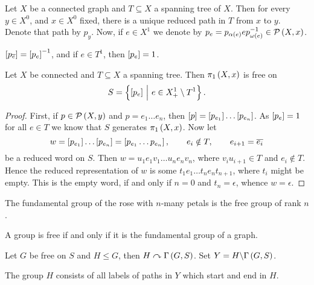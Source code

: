 \begin{definition}
Let $ X $ be a connected graph and $ T \subseteq X $ a spanning tree of $ X $. Then for every $ y \in X^0 $, and $ x \in X^0 $ fixed, there is a unique reduced path in $ T $ from $ x $ to $ y $. Denote that path by $ p_y $. Now, if $ e \in X^1 $ we denote by $ p_e = p_{\alpha\br{e}}ep_{\omega\br{e}}^{-1} \in \PPP\br{X, x} $.
\end{definition}

\begin{note*}
$ \sbr{p_{\overline{e}}} = \sbr{p_e}^{-1} $, and if $ e \in T^1 $, then $ \sbr{p_e} = 1 $.
\end{note*}

\begin{theorem}
Let $ X $ be connected and $ T \subseteq X $ a spanning tree. Then $ \pi_1\br{X, x} $ is free on
$$ S = \cbr{\sbr{p_e} \st e \in X_+^1 \setminus T^1}. $$
\end{theorem}

\begin{proof}
First, if $ p \in \PPP\br{X, y} $ and $ p = e_1 \dots e_n $, then $ \sbr{p} = \sbr{p_{e_1}} \dots \sbr{p_{e_n}} $. As $ \sbr{p_e} = 1 $ for all $ e \in T $ we know that $ S $ generates $ \pi_1\br{X, x} $. Now let
$$ w = \sbr{p_{e_1}} \dots \sbr{p_{e_n}} = \sbr{p_{e_1} \dots p_{e_n}}, \qquad e_i \notin T, \qquad e_{i + 1} = \overline{e_i} $$
be a reduced word on $ S $. Then $ w = u_1e_1v_1 \dots u_ne_nv_n $, where $ v_iu_{i + 1} \in T $ and $ e_i \notin T $. Hence the reduced representation of $ w $ is some $ t_1e_1 \dots t_ne_nt_{n + 1} $, where $ t_i $ might be empty. This is the empty word, if and only if $ n = 0 $ and $ t_n = \epsilon $, whence $ w = \epsilon $.
\end{proof}

\begin{example}
The fundamental group of the rose with $ n $-many petals is the free group of rank $ n $.
\end{example}

\begin{remark}
A group is free if and only if it is the fundamental group of a graph.
\end{remark}

Let $ G $ be free on $ S $ and $ H \le G $, then $ H \curvearrowright \Gamma\br{G, S} $. Set $ Y = H \backslash \Gamma\br{G, S} $.

\begin{lemma}
\label{lem:1.7.9}
The group $ H $ consists of all labels of paths in $ Y $ which start and end in $ H $.
\end{lemma}


